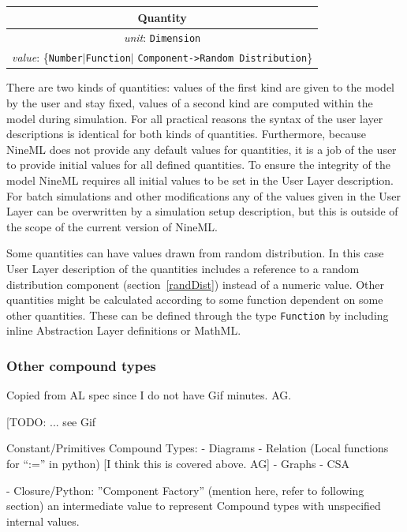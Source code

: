 \documentclass{article}
\begin{document}
\begin{table}[htb]
\center
\begin{tabular}{|c|}
\hline
\hline
Quantity \\
\hline
\hline
{\em unit}: {\tt Dimension} \\
\hline
{\em value}: \{{\tt Number}$|${\tt Function}$|$%
{\tt Component->Random Distribution}\} \\
\hline
\end{tabular}
\end{table}

There are two kinds of quantities: values of the first kind are given to the
model by the user and stay fixed, values of a second kind are computed within
the model during simulation. For all practical reasons the syntax of the user
layer descriptions is identical for both kinds of quantities. Furthermore,
because NineML does not provide any default values for quantities, it is a
job of the user to provide initial values for all defined quantities. To
ensure the integrity of the model NineML requires all initial values to be
set in the User Layer description. For batch simulations and other
modifications any of the values given in the User Layer can be overwritten
by a simulation setup description, but this is outside of the scope of the
current version of NineML.

Some quantities can have values drawn from random distribution. In this case
User Layer description of the quantities includes a reference to a random
distribution component (section~\ref{randDist}) instead of a numeric value.
Other quantities might be calculated according to some function dependent on
some other quantities. These can be defined through the type {\tt Function} by
including inline Abstraction Layer definitions or MathML.

\subsubsection{Other compound types}

Copied from AL spec since I do not have Gif minutes. AG.

[TODO: ... see Gif

Constant/Primitives
Compound Types:
- Diagrams
- Relation (Local functions for ``:='' in python) [I think this is covered above. AG]
- Graphs
- CSA

- Closure/Python: ''Component Factory'' (mention here, refer to following section)
  an intermediate value to represent Compound types with
  unspecified internal values.
\end{document}
